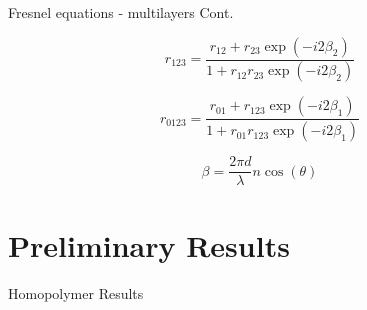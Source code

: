 \documentclass[10pt]{beamer}
\begin{document}
	\begin{frame}{Fresnel equations - multilayers Cont.}
	
	\begin{minipage}{0.47\textwidth}
	\begin{equation*}
	r_{123}= \frac{r_{12}+r_{23}\exp(-i2\beta_2)}{1+r_{12}r_{23}\exp(-i2\beta_2)}
	\end{equation*}
	
	\begin{equation*}
	r_{0123}= \frac{r_{01}+r_{123}\exp(-i2\beta_1)}{1+r_{01}r_{123}\exp(-i2\beta_1)}
	\end{equation*}
	\end{minipage}
	\begin{minipage}{0.5\textwidth}
		\begin{equation*}
		\beta=\frac{2\pi d}{\lambda} n\cos(\theta)
		\end{equation*}
	\end{minipage}
	\end{frame}
	
	\section{Preliminary Results}
	
	\begin{frame}{Homopolymer Results}
	
	\end{frame}
\end{document}
